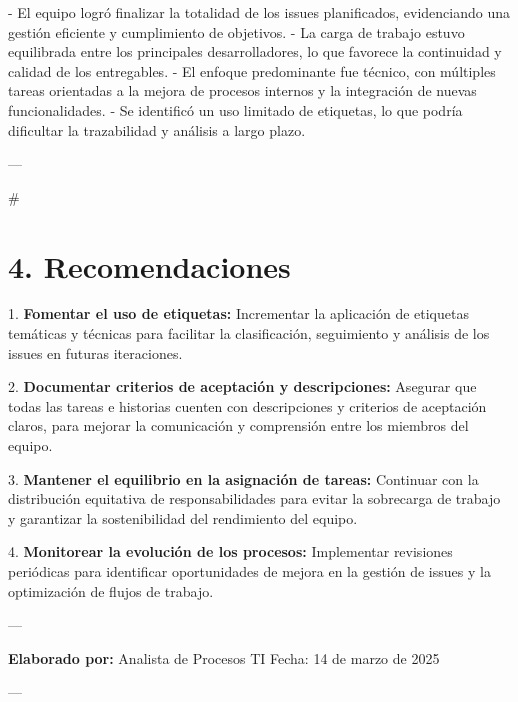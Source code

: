 \documentclass{article}
\begin{document}
- El equipo logró finalizar la totalidad de los issues planificados, evidenciando una gestión eficiente y cumplimiento de objetivos.
- La carga de trabajo estuvo equilibrada entre los principales desarrolladores, lo que favorece la continuidad y calidad de los entregables.
- El enfoque predominante fue técnico, con múltiples tareas orientadas a la mejora de procesos internos y la integración de nuevas funcionalidades.
- Se identificó un uso limitado de etiquetas, lo que podría dificultar la trazabilidad y análisis a largo plazo.

---

#\section{4. Recomendaciones}

1. \textbf{Fomentar el uso de etiquetas:}  
   Incrementar la aplicación de etiquetas temáticas y técnicas para facilitar la clasificación, seguimiento y análisis de los issues en futuras iteraciones.

2. \textbf{Documentar criterios de aceptación y descripciones:}  
   Asegurar que todas las tareas e historias cuenten con descripciones y criterios de aceptación claros, para mejorar la comunicación y comprensión entre los miembros del equipo.

3. \textbf{Mantener el equilibrio en la asignación de tareas:}  
   Continuar con la distribución equitativa de responsabilidades para evitar la sobrecarga de trabajo y garantizar la sostenibilidad del rendimiento del equipo.

4. \textbf{Monitorear la evolución de los procesos:}  
   Implementar revisiones periódicas para identificar oportunidades de mejora en la gestión de issues y la optimización de flujos de trabajo.

---

\textbf{Elaborado por:}  
Analista de Procesos TI  
Fecha: 14 de marzo de 2025

---
\end{document}
